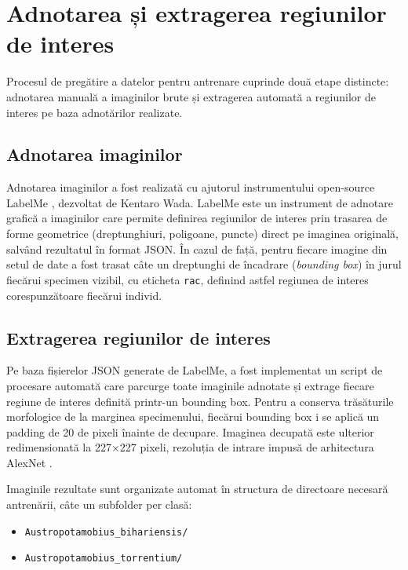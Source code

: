 \section{Adnotarea și extragerea regiunilor de interes}

Procesul de pregătire a datelor pentru antrenare cuprinde două etape distincte: adnotarea manuală a imaginilor brute și extragerea automată a regiunilor de interes pe baza adnotărilor realizate.

\subsection{Adnotarea imaginilor}

Adnotarea imaginilor a fost realizată cu ajutorul instrumentului open-source LabelMe \cite{labelme}, dezvoltat de Kentaro Wada. LabelMe este un instrument de adnotare grafică a imaginilor care permite definirea regiunilor de interes prin trasarea de forme geometrice (dreptunghiuri, poligoane, puncte) direct pe imaginea originală, salvând rezultatul în format JSON. În cazul de față, pentru fiecare imagine din setul de date a fost trasat câte un dreptunghi de încadrare (\textit{bounding box}) în jurul fiecărui specimen vizibil, cu eticheta \texttt{rac}, definind astfel regiunea de interes corespunzătoare fiecărui individ.

\subsection{Extragerea regiunilor de interes}

Pe baza fișierelor JSON generate de LabelMe, a fost implementat un script de procesare automată care parcurge toate imaginile adnotate și extrage fiecare regiune de interes definită printr-un bounding box. Pentru a conserva trăsăturile morfologice de la marginea specimenului, fiecărui bounding box i se aplică un padding de 20 de pixeli înainte de decupare. Imaginea decupată este ulterior redimensionată la 227×227 pixeli, rezoluția de intrare impusă de arhitectura AlexNet \cite{krizhevsky2012imagenet}.

Imaginile rezultate sunt organizate automat în structura de directoare necesară antrenării, câte un subfolder per clasă:

\begin{itemize}
    \item \texttt{Austropotamobius\_bihariensis/}
    \item \texttt{Austropotamobius\_torrentium/}
\end{itemize}

